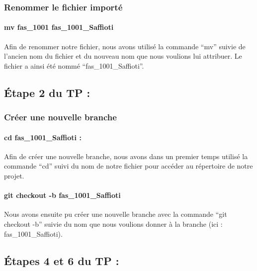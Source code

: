 \documentclass[
  letterpaper,
  DIV=11,
  numbers=noendperiod]{scrartcl}
\let\oldparagraph\paragraph
\renewcommand{\paragraph}[1]{\oldparagraph{#1}\mbox{}}
\begin{document}
\hypertarget{renommer-le-fichier-importuxe9}{%
\subsubsection{Renommer le fichier
importé}\label{renommer-le-fichier-importuxe9}}

\hypertarget{mv-fas_1001-fas_1001_saffioti}{%
\paragraph{mv fas\_1001
fas\_1001\_Saffioti}\label{mv-fas_1001-fas_1001_saffioti}}

Afin de renommer notre fichier, nous avons utilisé la commande ``mv''
suivie de l'ancien nom du fichier et du nouveau nom que nous voulions
lui attribuer. Le fichier a ainsi été nommé ``fas\_1001\_Saffioti''.

\hypertarget{uxe9tape-2-du-tp}{%
\subsection{Étape 2 du TP :}\label{uxe9tape-2-du-tp}}

\hypertarget{cruxe9er-une-nouvelle-branche}{%
\subsubsection{Créer une nouvelle
branche}\label{cruxe9er-une-nouvelle-branche}}

\hypertarget{cd-fas_1001_saffioti}{%
\paragraph{cd fas\_1001\_Saffioti :}\label{cd-fas_1001_saffioti}}

Afin de créer une nouvelle branche, nous avons dans un premier temps
utilisé la commande ``cd'' suivi du nom de notre fichier pour accéder au
répertoire de notre projet.

\hypertarget{git-checkout--b-fas_1001_saffioti}{%
\paragraph{git checkout -b
fas\_1001\_Saffioti}\label{git-checkout--b-fas_1001_saffioti}}

Nous avons ensuite pu créer une nouvelle branche avec la commande ``git
checkout -b'' suivie du nom que nous voulions donner à la branche (ici :
fas\_1001\_Saffioti).

\hypertarget{uxe9tapes-4-et-6-du-tp}{%
\subsection{Étapes 4 et 6 du TP :}\label{uxe9tapes-4-et-6-du-tp}}
\end{document}

